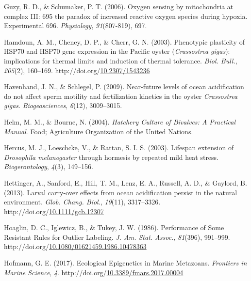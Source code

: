 \documentclass [11pt, proquest] {uwthesis}[2015/03/03]
\newlength{\cslhangindent}
\newenvironment{CSLReferences}%
{\setlength{\parindent}{0pt}%
\everypar{\setlength{\hangindent}{\cslhangindent}}\ignorespaces}%
{\par}
\begin{document}
\begin{CSLReferences}{1}{0}
\leavevmode\hypertarget{ref-Guzy2006}{}%
Guzy, R. D., \& Schumaker, P. T. (2006). {Oxygen sensing by mitochondria at complex III: 695 the paradox of increased reactive oxygen species during hypoxia. Experimental 696}. \emph{Physiology}, \emph{91}(807-819), 697.

\leavevmode\hypertarget{ref-Hamdoun2003}{}%
Hamdoun, A. M., Cheney, D. P., \& Cherr, G. N. (2003). {Phenotypic plasticity of HSP70 and HSP70 gene expression in the Pacific oyster (\emph{Crassostrea gigas}): implications for thermal limits and induction of thermal tolerance}. \emph{Biol. Bull.}, \emph{205}(2), 160--169. http://doi.org/\href{https://doi.org/10.2307/1543236}{10.2307/1543236}

\leavevmode\hypertarget{ref-Havenhand2009}{}%
Havenhand, J. N., \& Schlegel, P. (2009). {Near-future levels of ocean acidification do not affect sperm motility and fertilization kinetics in the oyster \emph{Crassostrea gigas}}. \emph{Biogeosciences}, \emph{6}(12), 3009--3015.

\leavevmode\hypertarget{ref-Helm2004}{}%
Helm, M. M., \& Bourne, N. (2004). \emph{{Hatchery Culture of Bivalves: A Practical Manual}}. Food; Agriculture Organization of the United Nations.

\leavevmode\hypertarget{ref-Hercus2003}{}%
Hercus, M. J., Loeschcke, V., \& Rattan, S. I. S. (2003). {Lifespan extension of \emph{Drosophila melanogaster} through hormesis by repeated mild heat stress}. \emph{Biogerontology}, \emph{4}(3), 149--156.

\leavevmode\hypertarget{ref-Hettinger2013}{}%
Hettinger, A., Sanford, E., Hill, T. M., Lenz, E. A., Russell, A. D., \& Gaylord, B. (2013). {Larval carry-over effects from ocean acidification persist in the natural environment}. \emph{Glob. Chang. Biol.}, \emph{19}(11), 3317--3326. http://doi.org/\href{https://doi.org/10.1111/gcb.12307}{10.1111/gcb.12307}

\leavevmode\hypertarget{ref-Hoaglin1986}{}%
Hoaglin, D. C., Iglewicz, B., \& Tukey, J. W. (1986). {Performance of Some Resistant Rules for Outlier Labeling}. \emph{J. Am. Stat. Assoc.}, \emph{81}(396), 991--999. http://doi.org/\href{https://doi.org/10.1080/01621459.1986.10478363}{10.1080/01621459.1986.10478363}

\leavevmode\hypertarget{ref-Hofmann2017}{}%
Hofmann, G. E. (2017). {Ecological Epigenetics in Marine Metazoans}. \emph{Frontiers in Marine Science}, \emph{4}. http://doi.org/\href{https://doi.org/10.3389/fmars.2017.00004}{10.3389/fmars.2017.00004}


\end{CSLReferences}
\end{document}
